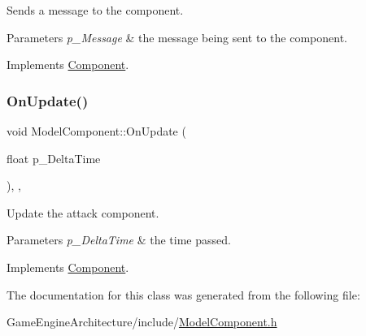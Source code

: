 Sends a message to the component. 


\begin{DoxyParams}{Parameters}
{\em p\+\_\+\+Message} & the message being sent to the component. \\
\hline
\end{DoxyParams}


Implements \mbox{\hyperlink{class_component_a1cd106256bf1791f9c6ab347776c7788}{Component}}.

\mbox{\label{class_model_component_a52333e35346182468a0bfe0311c900e0}} 
\subsubsection{\texorpdfstring{OnUpdate()}{OnUpdate()}}
{\footnotesize\ttfamily void Model\+Component\+::\+On\+Update (\begin{DoxyParamCaption}\item[{float}]{p\+\_\+\+Delta\+Time }\end{DoxyParamCaption})\hspace{0.3cm}{\ttfamily [inline]}, {\ttfamily [override]}, {\ttfamily [virtual]}}



Update the attack component. 


\begin{DoxyParams}{Parameters}
{\em p\+\_\+\+Delta\+Time} & the time passed. \\
\hline
\end{DoxyParams}


Implements \mbox{\hyperlink{class_component_ac080e9fa054949464c796b65a4b26b93}{Component}}.



The documentation for this class was generated from the following file\+:\begin{DoxyCompactItemize}
\item 
Game\+Engine\+Architecture/include/\mbox{\hyperlink{_model_component_8h}{Model\+Component.\+h}}\end{DoxyCompactItemize}

